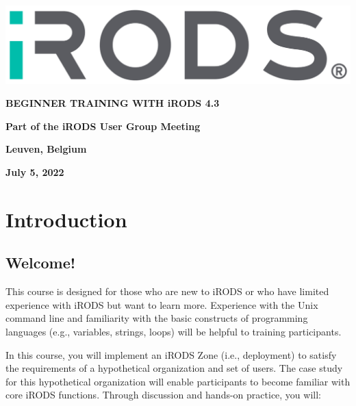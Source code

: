 \documentclass[10pt,oneside]{memoir}
\begin{document}
\thispagestyle{empty}

\centerline{\includegraphics[width=19cm]{irods_logo}}

\begin{center}

\vspace{20mm}
\huge{\textbf{BEGINNER TRAINING WITH iRODS 4.3}}

\vspace{60mm}
\textbf{Part of the iRODS User Group Meeting}

\vspace{10mm}
\textbf{Leuven, Belgium}

\vspace{10mm}
\textbf{July 5, 2022}

\end{center}

\newpage

\frontmatter

\tableofcontents*
\newpage

\chapter{Introduction}

\section{Welcome!}

This course is designed for those who are new to iRODS or who have limited experience with iRODS but want to learn more. Experience with the Unix command line and familiarity with the basic constructs of programming languages (e.g., variables, strings, loops) will be helpful to training participants.

In this course, you will implement an iRODS Zone (i.e., deployment) to satisfy the requirements of a hypothetical organization and set of users. The case study for this hypothetical organization will enable participants to become familiar with core iRODS functions. Through discussion and hands-on practice, you will:
\end{document}
